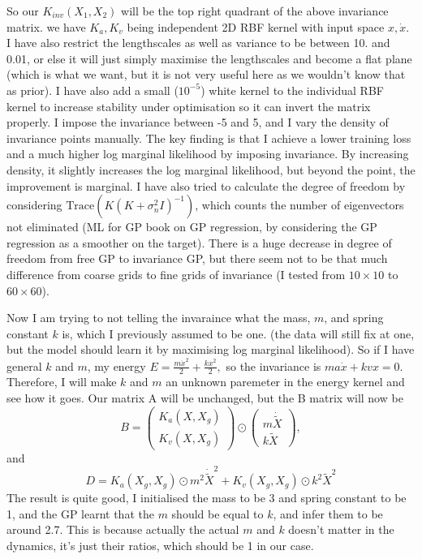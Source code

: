 \documentclass{article}
\begin{document}
So our $K_{inv}(X_1, X_2)$ will be the top right quadrant of the above invariance matrix. 
we have $K_a, K_v$ being independent 2D RBF kernel with input space $x, \dot{x}.$
I have also restrict the lengthscales as well as variance to be between 10. and 0.01, or else it will just simply maximise the lengthscales and become a flat plane (which is what we want, but it is not very useful here as we wouldn't know that as prior).
I have also add a small ($10^{-5}$) white kernel to the individual RBF kernel to increase stability under optimisation so it can invert the matrix properly. 
I impose the invariance between -5 and 5, and I vary the density of invariance points manually. 
The key finding is that I achieve a lower training loss and a much higher log marginal likelihood by imposing invariance. 
By increasing density, it slightly increases the log marginal likelihood, but beyond the point, the improvement is marginal.
I have also tried to calculate the degree of freedom by considering $\mathrm{Trace}(K(K+\sigma^2_nI)^{-1})$, which counts the number of eigenvectors not eliminated (ML for GP book on GP regression, by considering the GP regression as a smoother on the target). 
There is a huge decrease in degree of freedom from free GP to invariance GP, but there seem not to be that much difference from coarse grids to fine grids of invariance (I tested from $10\times 10$ to $60\times 60$).

Now I am trying to not telling the invaraince what the mass, $m$, and spring constant $k$ is, which I previously assumed to be one. (the data will still fix at one, but the model should learn it by maximising log marginal likelihood).
So if I have general $k$ and $m$, my energy $E=\frac{m\dot{x}^2}{2}+\frac{kx^2}{2},$ so the invariance is $ma\dot{x}+kvx=0.$
Therefore, I will make $k$ and $m$ an unknown paremeter in the energy kernel and see how it goes.
Our matrix A will be unchanged, but the B matrix will now be
$$
B = \begin{pmatrix}
  K_a(X, X_g) \\ K_v(X, X_g) \end{pmatrix}
  \odot \begin{pmatrix}
    m\dot{\tilde{X}} \\ k\tilde{X}
  \end{pmatrix}, 
$$
and 
$$
D = K_a(X_g, X_g) \odot m^2\dot{\tilde{X}}^2 + K_v(X_g, X_g) \odot k^2\tilde{X}^2
$$
The result is quite good, I initialised the mass to be 3 and spring constant to be 1, and the GP learnt that the $m$ should be equal to $k$, and infer them to be around 2.7. 
This is because actually the actual $m$ and $k$ doesn't matter in the dynamics, it's just their ratios, which should be 1 in our case. 
\end{document}
